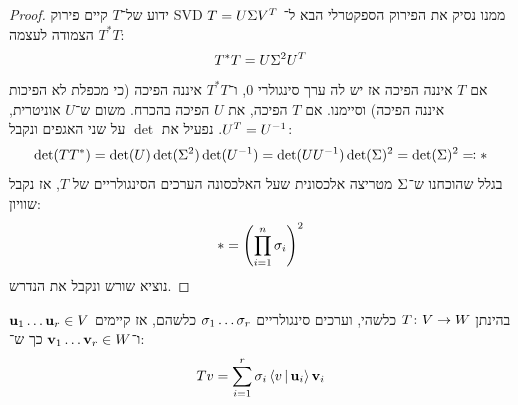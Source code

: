 \documentclass[name=רשימות אלגברה לינארית 2א]{../../../tex/classes/megasumPreamble}
\begin{document}
	\begin{proof}
		ידוע של־$T$ קיים פירוק SVD $T = U\Sigma V^T$ ממנו נסיק את הפירוק הספקטרלי הבא ל־$T^*T$ הצמודה לעצמה:
		\[ T^*T = U\Sigma^2U^T \]
		אם $T$ איננה הפיכה אז יש לה ערך סינגולרי $0$, ו־$T^*T$ איננה הפיכה (כי מכפלת לא הפיכות איננה הפיכה) וסיימנו. 
		אם $T$ הפיכה, את $U$ הפיכה בהכרח. משום ש־$U$ אוניטרית, $U^T = U^{-1}$. נפעיל את $\det$ על שני האגפים ונקבל: 
		\[ \det(TT^*) = \det(U)\det(\Sigma^2)\det(U^{-1}) = \det(UU^{-1})\det(\Sigma)^{2} = \det(\Sigma)^2 \eqqcolon * \]
		בגלל שהוכחנו ש־$\Sigma$ מטריצה אלכסונית שעל האלכסונה הערכים הסינגולריים של $T$, אז נקבל שוויון: 
		\[ * = \left ( \prod_{i = 1}^{n}\sigma_i \right )^{2} \]
		נוציא שורש ונקבל את הנדרש. 
	\end{proof}
	
	
	\begin{Theorem}
		בהינתן $T \colon V \to W$ כלשהי, וערכים סינגולריים $\sigma_1 \dots \sigma_r$ כלשהם, אז קיימים $\urm_1 \dots \urm_r \in V$ ו־$\vrm_1 \dots \vrm_r \in W$ כך ש־: 
		\[ Tv = \sum_{i = 1}^{r}\sigma_i \left \langle v \,\middle|\, \bm{\mathrm{u}}_i \right \rangle\bm{\mathrm{v}}_i \]
	\end{Theorem}
	
\end{document}
